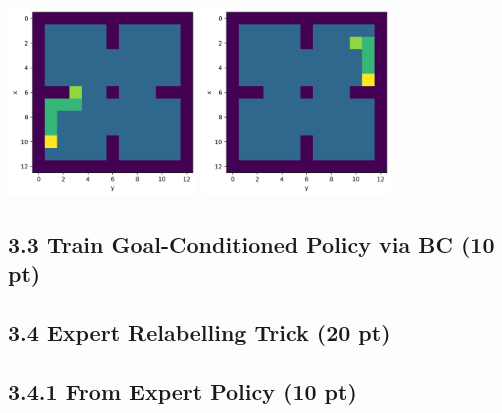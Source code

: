 \documentclass[12pt]{article}
\begin{document}
\includegraphics[height= 5cm, width=5cm]{p3-2-10}
\includegraphics[height= 5cm, width=5cm]{p3-2-11}

\subsection*{3.3 Train Goal-Conditioned Policy via BC (10 pt)}

\begin{tcolorbox}[fit,height=22em, width=40em, blank, borderline={1pt}{1pt},nobeforeafter]
\begin{center}

\end{center}
\end{tcolorbox}




\subsection*{3.4 Expert Relabelling Trick (20 pt)}
\subsection*{3.4.1 From Expert Policy (10 pt)}

\begin{tcolorbox}[fit,height=22em, width=40em, blank, borderline={1pt}{1pt},nobeforeafter]
\begin{center}

\end{center}
\end{tcolorbox}
\end{document}
